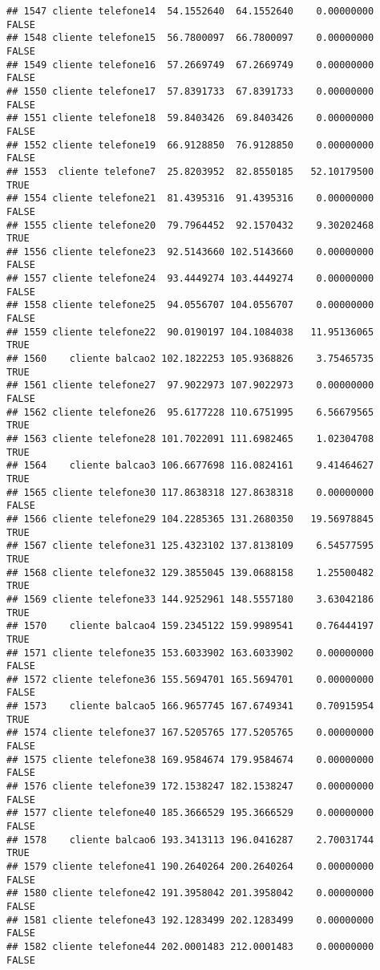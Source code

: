 \documentclass[
]{article}
\begin{document}
\begin{verbatim}
## 1547 cliente telefone14  54.1552640  64.1552640    0.00000000    FALSE
## 1548 cliente telefone15  56.7800097  66.7800097    0.00000000    FALSE
## 1549 cliente telefone16  57.2669749  67.2669749    0.00000000    FALSE
## 1550 cliente telefone17  57.8391733  67.8391733    0.00000000    FALSE
## 1551 cliente telefone18  59.8403426  69.8403426    0.00000000    FALSE
## 1552 cliente telefone19  66.9128850  76.9128850    0.00000000    FALSE
## 1553  cliente telefone7  25.8203952  82.8550185   52.10179500     TRUE
## 1554 cliente telefone21  81.4395316  91.4395316    0.00000000    FALSE
## 1555 cliente telefone20  79.7964452  92.1570432    9.30202468     TRUE
## 1556 cliente telefone23  92.5143660 102.5143660    0.00000000    FALSE
## 1557 cliente telefone24  93.4449274 103.4449274    0.00000000    FALSE
## 1558 cliente telefone25  94.0556707 104.0556707    0.00000000    FALSE
## 1559 cliente telefone22  90.0190197 104.1084038   11.95136065     TRUE
## 1560    cliente balcao2 102.1822253 105.9368826    3.75465735     TRUE
## 1561 cliente telefone27  97.9022973 107.9022973    0.00000000    FALSE
## 1562 cliente telefone26  95.6177228 110.6751995    6.56679565     TRUE
## 1563 cliente telefone28 101.7022091 111.6982465    1.02304708     TRUE
## 1564    cliente balcao3 106.6677698 116.0824161    9.41464627     TRUE
## 1565 cliente telefone30 117.8638318 127.8638318    0.00000000    FALSE
## 1566 cliente telefone29 104.2285365 131.2680350   19.56978845     TRUE
## 1567 cliente telefone31 125.4323102 137.8138109    6.54577595     TRUE
## 1568 cliente telefone32 129.3855045 139.0688158    1.25500482     TRUE
## 1569 cliente telefone33 144.9252961 148.5557180    3.63042186     TRUE
## 1570    cliente balcao4 159.2345122 159.9989541    0.76444197     TRUE
## 1571 cliente telefone35 153.6033902 163.6033902    0.00000000    FALSE
## 1572 cliente telefone36 155.5694701 165.5694701    0.00000000    FALSE
## 1573    cliente balcao5 166.9657745 167.6749341    0.70915954     TRUE
## 1574 cliente telefone37 167.5205765 177.5205765    0.00000000    FALSE
## 1575 cliente telefone38 169.9584674 179.9584674    0.00000000    FALSE
## 1576 cliente telefone39 172.1538247 182.1538247    0.00000000    FALSE
## 1577 cliente telefone40 185.3666529 195.3666529    0.00000000    FALSE
## 1578    cliente balcao6 193.3413113 196.0416287    2.70031744     TRUE
## 1579 cliente telefone41 190.2640264 200.2640264    0.00000000    FALSE
## 1580 cliente telefone42 191.3958042 201.3958042    0.00000000    FALSE
## 1581 cliente telefone43 192.1283499 202.1283499    0.00000000    FALSE
## 1582 cliente telefone44 202.0001483 212.0001483    0.00000000    FALSE

\end{verbatim}
\end{document}
